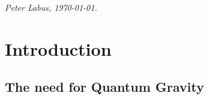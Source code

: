 \documentclass[11pt]{book} %
\numberwithin{equation}{chapter}
\begin{document}
\begin{flushright}
  \textit{Peter Labus, \monthyeardate\today.}
\end{flushright}

\makeatletter
\@openrighttrue
\makeatother


\pagestyle{empty} %

\tableofcontents %

\pagestyle{fancy} %



\chapter*{Introduction}

\section*{The need for Quantum Gravity}

\end{document}
